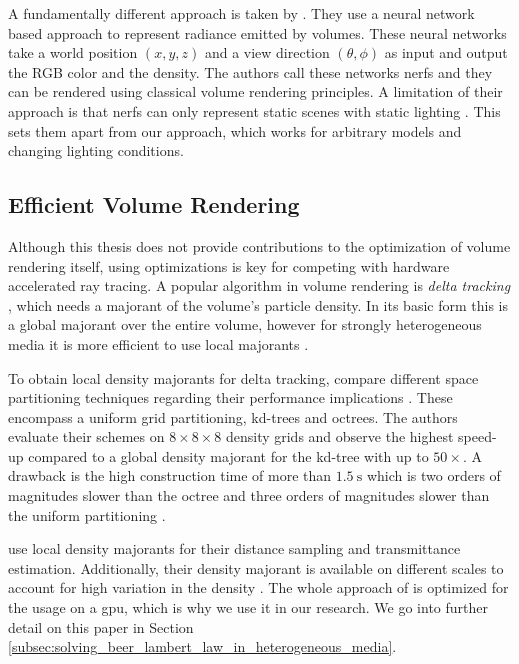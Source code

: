 A fundamentally different approach is taken by \citeauthor{mildenhall_nerf} \cite{mildenhall_nerf}.
They use a neural network based approach to represent radiance emitted by volumes.
These neural networks take a world position $(x, y, z)$ and a view direction $(\theta, \phi)$ as input and output the RGB color and the density.
The authors call these networks \acp{nerf} and they can be rendered using classical volume rendering principles.
A limitation of their approach is that \acsp{nerf} can only represent static scenes with static lighting \cite{mildenhall_nerf}.
This sets them apart from our approach, which works for arbitrary models and changing lighting conditions.

\subsection{Efficient Volume Rendering}
Although this thesis does not provide contributions to the optimization of volume rendering itself, using optimizations is key for competing with hardware accelerated ray tracing.
A popular algorithm in volume rendering is \textit{delta tracking} \cite{woodcock}, which needs a majorant of the volume's particle density.
In its basic form this is a global majorant over the entire volume, however for strongly heterogeneous media it is more efficient to use local majorants \cite{novak_overview}.

To obtain local density majorants for delta tracking, \citeauthor{yue_space_partitioning} compare different space partitioning techniques regarding their performance implications \cite{yue_space_partitioning}.
These encompass a uniform grid partitioning, kd-trees and octrees.
The authors evaluate their schemes on $8 \times 8 \times 8$ density grids and observe the highest speed-up compared to a global density majorant for the kd-tree with up to ${50\times}$.
A drawback is the high construction time of more than $\SI{1.5}{\s}$ which is two orders of magnitudes slower than the octree and three orders of magnitudes slower than the uniform partitioning \cite{yue_space_partitioning}.

\citeauthor{brick_grid} use local density majorants for their distance sampling and transmittance estimation.
Additionally, their density majorant is available on different scales to account for high variation in the density \cite{brick_grid}.
The whole approach of \citeauthor{brick_grid} is optimized for the usage on a \ac{gpu}, which is why we use it in our research.
We go into further detail on this paper in Section \ref{subsec:solving_beer_lambert_law_in_heterogeneous_media}.

